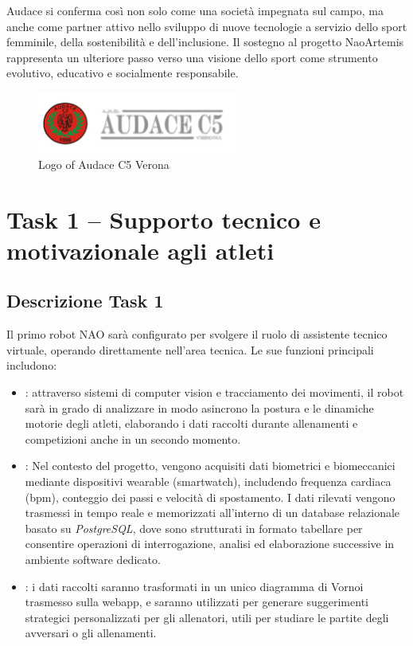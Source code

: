\documentclass{optica-article}
\begin{document}
Audace si conferma cos\`i non solo come una societ\`a impegnata sul campo, ma anche come partner attivo nello sviluppo di nuove tecnologie a servizio dello sport femminile, della sostenibilit\`a e dell'inclusione. Il sostegno al progetto NaoArtemis rappresenta un ulteriore passo verso una visione dello sport come strumento evolutivo, educativo e socialmente responsabile.

\begin{figure}[H]
    \centering
    \includegraphics[width=0.6\textwidth]{figures/audace.png}
    \caption{Logo of Audace C5 Verona}
    \label{fig:audace_logo}
\end{figure}

\bigskip
\section{Task 1 -- Supporto tecnico e motivazionale agli atleti}

\subsection{Descrizione Task 1}
Il primo robot NAO sar\`a configurato per svolgere il ruolo di assistente tecnico virtuale, operando direttamente nell'area tecnica. Le sue funzioni principali includono:

\begin{itemize}
    \item {}: attraverso sistemi di computer vision e tracciamento dei movimenti, il robot sarà in grado di analizzare in modo asincrono la postura e le dinamiche motorie degli atleti, elaborando i dati raccolti durante allenamenti e competizioni anche in un secondo momento. 

    \item{}: 
    Nel contesto del progetto, vengono acquisiti dati biometrici e biomeccanici mediante dispositivi wearable (smartwatch), includendo frequenza cardiaca (bpm), conteggio dei passi e velocità di spostamento. I dati rilevati vengono trasmessi in tempo reale e memorizzati all’interno di un database relazionale basato su \textit{PostgreSQL}, dove sono strutturati in formato tabellare per consentire operazioni di interrogazione, analisi ed elaborazione successive in ambiente software dedicato.

    \item {}: i dati raccolti saranno trasformati in un unico diagramma di Vornoi trasmesso sulla webapp, e saranno utilizzati per generare suggerimenti strategici personalizzati per gli allenatori, utili per studiare le partite degli avversari o gli allenamenti.
\end{itemize}
\end{document}
